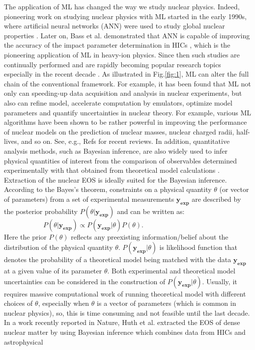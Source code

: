 \documentclass[twocolumn,aps,superscriptaddress]{revtex4}
\begin{document}
The application of ML has changed the way we study nuclear physics.
Indeed, pioneering work on studying nuclear physics with ML started in the early 1990s, where artificial neural networks (ANN) were used to study global nuclear properties \cite{gazula1992learning}. Later on, Bass et al. demonstrated that ANN is capable of improving the accuracy of the impact parameter determination in HICs \cite{bass1994neural}, which is the pioneering application of ML in heavy-ion physics. Since then such studies are continually performed and are rapidly becoming popular research topics especially in the recent decade \cite{bedaque2021ai,boehnlein2022colloquium,he2023high,he2023machine}. As illustrated in Fig.\ref{fig:1}, ML can alter the full chain of the conventional framework. For example, it has been found that ML not only can speeding-up data acquisition and analysis in nuclear experiments, but also can refine model, accelerate computation by emulators, optimize model parameters and quantify uncertainties in nuclear theory. For example, various ML algorithms have been shown to be rather powerful in improving the performance of nuclear models on the prediction of nuclear masses, nuclear charged radii, half-lives, and so on. See, e.g., Refs \cite{bedaque2021ai,boehnlein2022colloquium,he2023high,he2023machine} for recent reviews.
In addition, quantitative analysis methods, such as Bayesian inference, are also widely used to infer physical quantities of interest from the comparison of observables determined experimentally with that obtained from theoretical model calculations \cite{morfouace2019constraining,man2022,baoan2023}. Extraction of the nuclear EOS is ideally suited for the Bayesian inference. According to the Bayes's theorem, constraints on a physical quantity $\theta$ (or vector of parameters) from a set of experimental measurements $\mathbf{y_{exp}}$ are described by the posterior probability $P(\theta|\mathbf{y_{exp}})$ and can be written as:
\begin{equation}
P(\theta|\mathbf{y_{exp}}) \propto P(\mathbf{y_{exp}}|\theta) P(\theta).\qquad\qquad\qquad\qquad\qquad
\end{equation}
Here the prior $P(\theta)$ reflects any preexisting information/belief about the distribution of the physical quantity $\theta$. $P(\mathbf{y_{exp}}|\theta)$ is likelihood function that denotes the probability of a theoretical model being
matched with the data $\mathbf{y_{exp}}$ at a given value of its parameter $\theta$. Both  experimental and theoretical model uncertainties can be considered in the construction of $P(\mathbf{y_{exp}}|\theta)$. Usually, it requires massive computational work of running theoretical model with different choices of $\theta$, especially when $\theta$ is a vector of parameters (which is common in nuclear physics), so, this is time consuming and not feasible until the last decade. In a work recently reported in Nature, Huth et al. extracted the EOS of dense nuclear matter by using Bayesian inference which combines data from HICs and astrophysical
\end{document}
